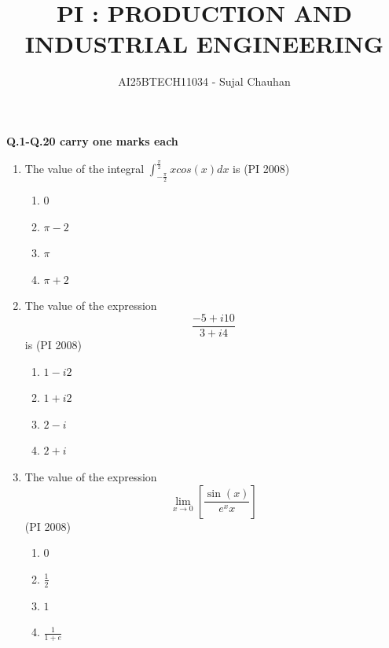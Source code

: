 \documentclass[journal,12pt,onecolumn]{IEEEtran}
\theoremstyle{remark}
\begin{document}
\title{PI : PRODUCTION AND INDUSTRIAL ENGINEERING}
\author{AI25BTECH11034 - Sujal Chauhan}
\maketitle
\renewcommand{\thefigure}{\theenumi}
\renewcommand{\thetable}{\theenumi}
\textbf{Q.1-Q.20 carry one marks each}
\vspace{1cm}

\begin{enumerate}

    

    \item %
    The value of the integral $\int_{-\frac{\pi}{2}}^{\frac{\pi}{2}}xcos(x)dx$ is 
    \hfill{(PI 2008)}
    \begin{multicols}{4}
    \begin{enumerate}
        \item $0$
        \item $\pi-2$
        \item $\pi$
        \item $\pi+2$
    \end{enumerate}
\end{multicols}
\vspace{1cm}
\item %
The value of the expression $$\frac{-5+i10}{3+i4}$$ is 
    \hfill{(PI 2008)}
    \begin{multicols}{4}
    \begin{enumerate}
        \item $1-i2$
        \item $1+i2$
        \item $2-i$
        \item $2+i$
    \end{enumerate}
\end{multicols}
\vspace{1cm}
\item %
The value of the expression $$\lim_{x\to0}\left[\frac{\sin(x)}{e^xx}\right]$$  
    \hfill{(PI 2008)}
    \begin{multicols}{4}
    \begin{enumerate}
        \item $0$
        \item $\frac{1}{2}$
        \item $1$
        \item $\frac{1}{1+e}$
    \end{enumerate}
\end{multicols}

\end{enumerate}
\end{document}
